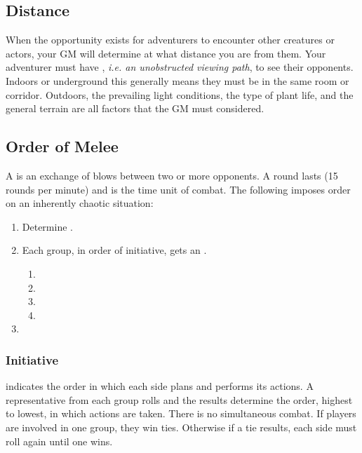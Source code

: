 \begin{multicols*}{2}
\subsection{Distance}
When the opportunity exists for adventurers to encounter other creatures or actors, your GM will determine at what distance you are from them. Your adventurer must have , \textit{i.e. an unobstructed viewing path}, to see their opponents. Indoors or underground this generally means they must be in the same room or corridor. Outdoors, the prevailing light conditions, the type of plant life, and the general terrain are all factors that the GM must considered.
\subsection{Order of Melee}
A  is an exchange of blows between two or more opponents. A round lasts  (15 rounds per minute) and is the time unit of combat. The following  imposes order on an inherently chaotic situation:
\begin{enumerate}[leftmargin=12pt]
\item Determine .
\item Each group, in order of initiative, gets an .
\begin{enumerate}[leftmargin=12pt]
\item {}
\item {}
\item {}
\item {}
\end{enumerate}
\item {}
\end{enumerate}
\subsubsection{Initiative}
 indicates the order in which each side plans and performs its actions. A representative from each group rolls  and the results determine the order, highest to lowest, in which actions are taken. There is no simultaneous combat. If players are involved in one group, they win ties. Otherwise if a tie results, each side must roll again until one wins.


\end{multicols*}

